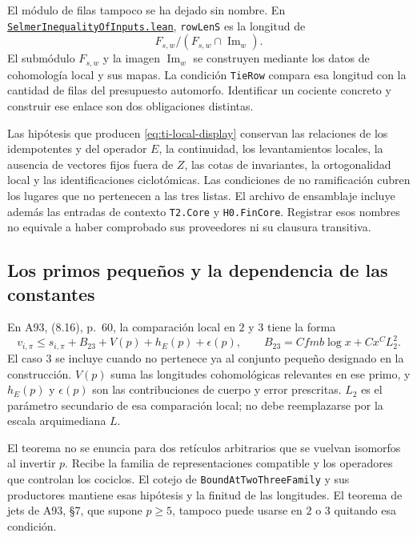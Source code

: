 El módulo de filas tampoco se ha dejado sin nombre. En
\href{https://github.com/CocoSgt/riemann-hypothesis-lean/blob/7cbf7a0c32fca1badf05931879a37c3f8a2b03b4/src/Formalism/AdmissibleDesigns/SelmerInequalityOfInputs.lean}{\nolinkurl{SelmerInequalityOfInputs.lean}},
\texttt{rowLenS} es la longitud de
\begin{equation}
 F_{s,w}/(F_{s,w}\cap\operatorname{Im}_w).
 \label{eq:ti-row}
\end{equation}
El submódulo $F_{s,w}$ y la imagen $\operatorname{Im}_w$ se
construyen mediante los datos de cohomología local y sus mapas.
La condición \texttt{TieRow} compara esa longitud con la
cantidad de filas del presupuesto automorfo.
Identificar un cociente concreto y construir ese enlace son
dos obligaciones distintas.

Las hipótesis que producen \eqref{eq:ti-local-display} conservan
las relaciones de los idempotentes y del operador $E$, la
continuidad, los levantamientos locales, la ausencia de vectores
fijos fuera de $Z$, las cotas de invariantes, la ortogonalidad
local y las identificaciones ciclotómicas. Las condiciones de
no ramificación cubren los lugares que no pertenecen a las
tres listas. El archivo de ensamblaje incluye además las
entradas de contexto \texttt{T2.Core} y \texttt{H0.FinCore}.
Registrar esos nombres no equivale a haber comprobado sus
proveedores ni su clausura transitiva.

\subsection{Los primos pequeños y la dependencia de las constantes}

En A93, (8.16), p.~60, la comparación local en $2$ y $3$ tiene
la forma
\begin{equation}
 v_{i,\pi}\le s_{i,\pi}+B_{23}+V(p)+h_E(p)+\epsilon(p),
 \qquad B_{23}=Cfmb\log x+Cx^C L_2^2.
 \label{eq:ti-small}
\end{equation}
El caso $3$ se incluye cuando no pertenece ya al conjunto
pequeño designado en la construcción. $V(p)$ suma las longitudes
cohomológicas relevantes en ese primo, y $h_E(p)$ y $\epsilon(p)$
son las contribuciones de cuerpo y error prescritas.
$L_2$ es el parámetro secundario de esa comparación local;
no debe reemplazarse por la escala arquimediana $L$.

El teorema no se enuncia para dos retículos arbitrarios
que se vuelvan isomorfos al invertir $p$. Recibe la familia
de representaciones compatible y los operadores que controlan
los cociclos. El cotejo de
\texttt{BoundAtTwoThreeFamily} y sus productores mantiene
esas hipótesis y la finitud de las longitudes.
El teorema de jets de A93, §7, que supone $p\ge5$, tampoco
puede usarse en $2$ o $3$ quitando esa condición.

